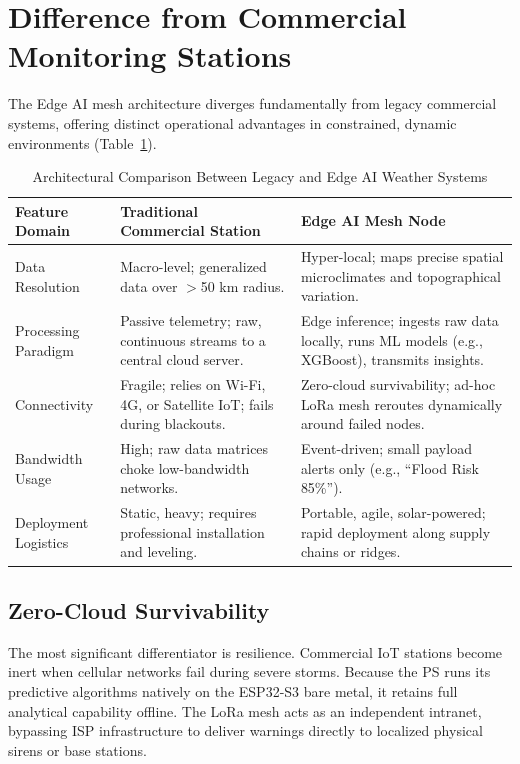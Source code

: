 \documentclass[conference]{IEEEtran}
\begin{document}
\section{Difference from Commercial Monitoring Stations}
\label{sec:comparison}

The Edge AI mesh architecture diverges fundamentally from legacy
commercial systems, offering distinct operational advantages in
constrained, dynamic environments (Table~\ref{tab:comparison}).

\begin{table}[htbp]
\caption{Architectural Comparison Between Legacy and Edge AI Weather Systems}
\label{tab:comparison}
\centering
\begin{tabular}{@{}p{2.6cm}p{6.8cm}p{6.8cm}@{}}
\toprule
\textbf{Feature Domain} & \textbf{Traditional Commercial Station} & \textbf{Edge AI Mesh Node} \\
\midrule
Data Resolution & Macro-level; generalized data over $>$50 km radius. & Hyper-local; maps precise spatial microclimates and topographical variation. \\
Processing Paradigm & Passive telemetry; raw, continuous streams to a central cloud server. & Edge inference; ingests raw data locally, runs ML models (e.g., XGBoost), transmits insights. \\
Connectivity & Fragile; relies on Wi-Fi, 4G, or Satellite IoT; fails during blackouts. & Zero-cloud survivability; ad-hoc LoRa mesh reroutes dynamically around failed nodes. \\
Bandwidth Usage & High; raw data matrices choke low-bandwidth networks. & Event-driven; small payload alerts only (e.g., ``Flood Risk 85\%''). \\
Deployment Logistics & Static, heavy; requires professional installation and leveling. & Portable, agile, solar-powered; rapid deployment along supply chains or ridges. \\
\bottomrule
\end{tabular}
\end{table}

\subsection{Zero-Cloud Survivability}

The most significant differentiator is resilience. Commercial IoT
stations become inert when cellular networks fail during severe storms.
Because the PS runs its predictive algorithms natively on the ESP32-S3
bare metal, it retains full analytical capability offline. The LoRa mesh
acts as an independent intranet, bypassing ISP infrastructure to deliver
warnings directly to localized physical sirens or base stations.
\end{document}
